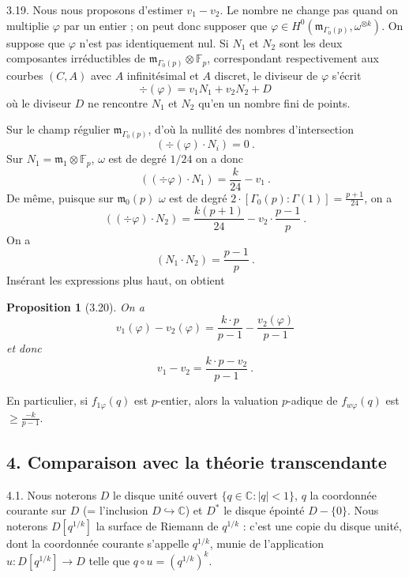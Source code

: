 \documentclass[12pt,a4paper]{amsart}
\theoremstyle{plain}
\newtheorem{proposition}{Proposition}[section]
\theoremstyle{definition}
\theoremstyle{remark}
\newcommand{\CC}{\mathbb{C}}
\newcommand{\FF}{\mathbb{F}}
\begin{document}
3.19. Nous nous proposons d'estimer $v_1 - v_2$. Le nombre ne change pas quand on multiplie $\varphi$ par un entier ; on peut donc supposer que $\varphi \in H^0(\mathfrak{m}_{\Gamma_0(p)}, \omega^{\otimes k})$. On suppose que $\varphi$ n'est pas identiquement nul. Si $N_1$ et $N_2$ sont les deux composantes irr\'eductibles de $\mathfrak{m}_{\Gamma_0(p)} \otimes \FF_p$, correspondant respectivement aux courbes $(C, A)$ avec $A$ infinit\'esimal et $A$ discret, le diviseur de $\varphi$ s'\'ecrit
\[
\div(\varphi) = v_1 N_1 + v_2 N_2 + D
\]
o\`u le diviseur $D$ ne rencontre $N_1$ et $N_2$ qu'en un nombre fini de points.

Sur le champ r\'egulier $\mathfrak{m}_{\Gamma_0(p)}$, d'o\`u la nullit\'e des nombres d'intersection
\[
(\div(\varphi) \cdot N_i) = 0 \ .
\]
Sur $N_1 = \mathfrak{m}_1 \otimes \FF_p$, $\omega$ est de degr\'e $1/24$ on a donc
\[
((\div \varphi) \cdot N_1) = \frac{k}{24} - v_1 \ .
\]
De m\^eme, puisque sur $\mathfrak{m}_0(p)$ $\omega$ est de degr\'e $2 \cdot [\Gamma_0(p) : \Gamma(1)] = \frac{p+1}{24}$, on a
\[
((\div \varphi) \cdot N_2) = \frac{k(p+1)}{24} - v_2 \cdot \frac{p-1}{p} \ .
\]
On a
\[
(N_1 \cdot N_2) = \frac{p-1}{p} \ .
\]
Ins\'erant les expressions plus haut, on obtient

\begin{proposition}[3.20]
On a
\[
v_1(\varphi) - v_2(\varphi) = \frac{k \cdot p}{p-1} - \frac{v_2(\varphi)}{p-1}
\]
et donc
\[
v_1 - v_2 = \frac{k \cdot p - v_2}{p-1} \ .
\]
\end{proposition}

En particulier, si $f_{1\varphi}(q)$ est $p$-entier, alors la valuation $p$-adique de $f_{w\varphi}(q)$ est $\geq \frac{-k}{p-1}$.


\subsection*{4. Comparaison avec la th\'eorie transcendante}

\setcounter{proposition}{0}

4.1. Nous noterons $D$ le disque unit\'e ouvert $\{q \in \CC : |q| < 1\}$, $q$ la coordonn\'ee courante sur $D$ (= l'inclusion $D \hookrightarrow \CC$) et $D^*$ le disque \'epoint\'e $D - \{0\}$. Nous noterons $D[q^{1/k}]$ la surface de Riemann de $q^{1/k}$ : c'est une copie du disque unit\'e, dont la coordonn\'ee courante s'appelle $q^{1/k}$, munie de l'application $u : D[q^{1/k}] \rightarrow D$ telle que $q \circ u = (q^{1/k})^k$.
\end{document}
